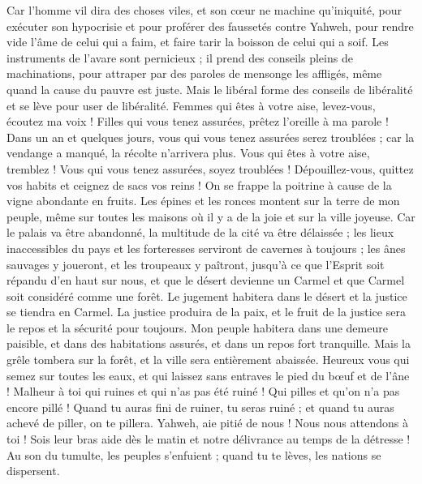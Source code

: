 \begin{multicols}{2}
Car l'homme vil dira des choses viles, et son cœur ne machine qu'iniquité, pour exécuter son hypocrisie et pour proférer des faussetés contre Yahweh, pour rendre vide l'âme de celui qui a faim, et faire tarir la boisson de celui qui a soif.
Les instruments de l'avare sont pernicieux ; il prend des conseils pleins de machinations, pour attraper par des paroles de mensonge les affligés, même quand la cause du pauvre est juste.
Mais le libéral forme des conseils de libéralité et se lève pour user de libéralité.
Femmes qui êtes à votre aise, levez-vous, écoutez ma voix ! Filles qui vous tenez assurées, prêtez l'oreille à ma parole !
Dans un an et quelques jours, vous qui vous tenez assurées serez troublées ; car la vendange a manqué, la récolte n'arrivera plus.
Vous qui êtes à votre aise, tremblez ! Vous qui vous tenez assurées, soyez troublées ! Dépouillez-vous, quittez vos habits et ceignez de sacs vos reins !
On se frappe la poitrine à cause de la vigne abondante en fruits.
Les épines et les ronces montent sur la terre de mon peuple, même sur toutes les maisons où il y a de la joie et sur la ville joyeuse.
Car le palais va être abandonné, la multitude de la cité va être délaissée ; les lieux inaccessibles du pays et les forteresses serviront de cavernes à toujours ; les ânes sauvages y joueront, et les troupeaux y paîtront,
jusqu'à ce que l'Esprit soit répandu d'en haut sur nous, et que le désert devienne un Carmel et que Carmel  soit considéré comme une forêt.
Le jugement habitera dans le désert et la justice se tiendra en Carmel.
La justice produira de la paix, et le fruit de la justice sera le repos et la sécurité pour toujours.
Mon peuple habitera dans une demeure paisible, et dans des habitations assurés, et dans un repos fort tranquille.
Mais la grêle tombera sur la forêt, et la ville sera entièrement abaissée.
Heureux vous qui semez sur toutes les eaux, et qui laissez sans entraves le pied du bœuf et de l'âne !
\VerseOne{}Malheur à toi qui ruines et qui n'as pas été ruiné ! Qui pilles et qu'on n'a pas encore pillé ! Quand tu auras fini de ruiner, tu seras ruiné ; et quand tu auras achevé de piller, on te pillera.
Yahweh, aie pitié de nous ! Nous nous attendons à toi ! Sois leur bras aide dès le matin et notre délivrance au temps de la détresse !
Au son du tumulte, les peuples s'enfuient ; quand tu te lèves, les nations se dispersent.

\end{multicols}
